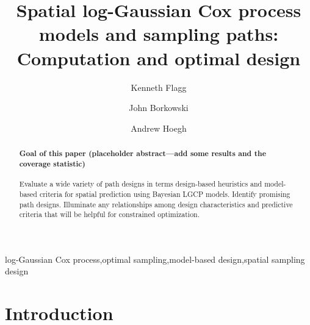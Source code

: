 \documentclass[review]{elsarticle}
\begin{document}
\begin{frontmatter}

\title{Spatial log-Gaussian Cox process models and sampling paths: Computation and optimal design}

\author[msuaddr]{Kenneth Flagg}

\author[msuaddr]{John Borkowski}
\author[msuaddr]{Andrew Hoegh}

\address[msuaddr]{Department of Mathematical Sciences, Montana State University, Bozeman, MT 59717}

\begin{abstract}

\paragraph{Goal of this paper (placeholder abstract---add some results and the
coverage statistic)} Evaluate a wide variety of path designs in terms
design-based heuristics and model-based criteria for spatial prediction using
Bayesian LGCP models. Identify promising path designs. Illuminate any
relationships among design characteristics and predictive criteria that will be
helpful for constrained optimization.

\end{abstract}

\begin{keyword}
log-Gaussian Cox process\sep optimal sampling\sep model-based design\sep spatial sampling design
\end{keyword}

\end{frontmatter}

\linenumbers



\section{Introduction}
\end{document}
